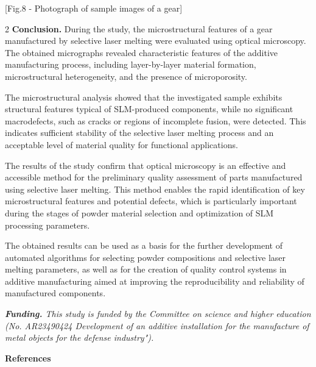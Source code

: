 [Fig.8 - Photograph of sample images of a gear]

\begin{multicols}{2}
{\bfseries Conclusion.} During the study, the microstructural features of a
gear manufactured by selective laser melting were evaluated using
optical microscopy. The obtained micrographs revealed characteristic
features of the additive manufacturing process, including layer-by-layer
material formation, microstructural heterogeneity, and the presence of
microporosity.

The microstructural analysis showed that the investigated sample
exhibits structural features typical of SLM-produced components, while
no significant macrodefects, such as cracks or regions of incomplete
fusion, were detected. This indicates sufficient stability of the
selective laser melting process and an acceptable level of material
quality for functional applications.

The results of the study confirm that optical microscopy is an effective
and accessible method for the preliminary quality assessment of parts
manufactured using selective laser melting. This method enables the
rapid identification of key microstructural features and potential
defects, which is particularly important during the stages of powder
material selection and optimization of SLM processing parameters.

The obtained results can be used as a basis for the further development
of automated algorithms for selecting powder compositions and selective
laser melting parameters, as well as for the creation of quality control
systems in additive manufacturing aimed at improving the reproducibility
and reliability of manufactured components.

\emph{{\bfseries Funding.} This study is funded by the Committee on science
and higher education (No. AR23490424 Development of an additive
installation for the manufacture of metal objects for the defense
industry").}
\end{multicols}

\begin{center}
{\bfseries References}
\end{center}

